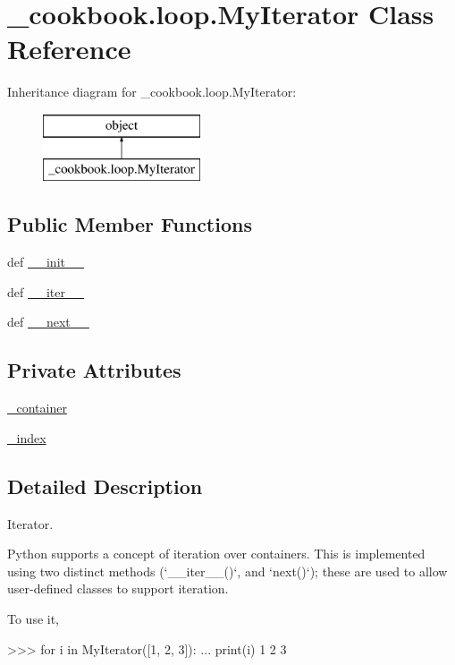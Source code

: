\hypertarget{class__cookbook_1_1loop_1_1MyIterator}{\section{\-\_\-cookbook.\-loop.\-My\-Iterator Class Reference}
\label{class__cookbook_1_1loop_1_1MyIterator}
}
Inheritance diagram for \-\_\-cookbook.\-loop.\-My\-Iterator\-:\begin{figure}[H]
\begin{center}
\leavevmode
\includegraphics[height=2.000000cm]{d9/de3/class__cookbook_1_1loop_1_1MyIterator}
\end{center}
\end{figure}
\subsection*{Public Member Functions}
\begin{DoxyCompactItemize}
\item 
def \hyperlink{class__cookbook_1_1loop_1_1MyIterator_a0d22013198b99735cf506c1b783f2963}{\-\_\-\-\_\-init\-\_\-\-\_\-}
\item 
def \hyperlink{class__cookbook_1_1loop_1_1MyIterator_a41f8dca4e290ba0fd53ac547d448de1f}{\-\_\-\-\_\-iter\-\_\-\-\_\-}
\item 
def \hyperlink{class__cookbook_1_1loop_1_1MyIterator_ab9f3bae16f2426e6679df31ebbab766c}{\-\_\-\-\_\-next\-\_\-\-\_\-}
\end{DoxyCompactItemize}
\subsection*{Private Attributes}
\begin{DoxyCompactItemize}
\item 
\hyperlink{class__cookbook_1_1loop_1_1MyIterator_ac35e940f5d4704ce7fd0799d5affc2a2}{\-\_\-container}
\item 
\hyperlink{class__cookbook_1_1loop_1_1MyIterator_ad149ab2885a56c2a16b18800e91c5233}{\-\_\-index}
\end{DoxyCompactItemize}


\subsection{Detailed Description}
\begin{DoxyVerb}Iterator.

Python supports a concept of iteration over containers. This is
implemented using two distinct methods (`__iter__()`, and `next()`); these
are used to allow user-defined classes to support iteration.

To use it,

    >>> for i in MyIterator([1, 2, 3]):
    ...    print(i)
    1
    2
    3\end{DoxyVerb}
 

